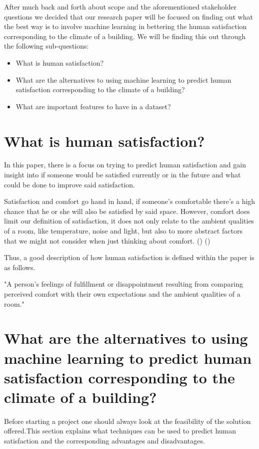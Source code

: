 \documentclass[12pt,a4paper]{article}
\begin{document}
After much back and forth about scope and the aforementioned stakeholder questions we decided that our research paper will be focused on finding out what the best way is to involve machine learning in bettering the human satisfaction corresponding to the climate of a building. 
We will be finding this out through the following sub-questions:

\begin{itemize}
	\item What is human satisfaction?
	\item What are the alternatives to using machine learning to predict human satisfaction corresponding to the climate of a building?
	\item What are important features to have in a dataset?
\end{itemize}

\pagebreak

\section{What is human satisfaction?}
In this paper, there is a focus on trying to predict human satisfaction and gain insight into if someone would be satisfied currently or in the future and what could be done to improve said satisfaction.

Satisfaction and comfort go hand in hand, if someone's comfortable there's a high chance that he or she will also be satisfied by said space. However, comfort does limit our definition of satisfaction, it does not only relate to the ambient qualities of a room, like temperature, noise and light, but also to more abstract factors that we might not consider when just thinking about comfort.
(\cite{Comfort_in_architecture}) (\cite{Human_Wants})

Thus, a good description of how human satisfaction is defined within the paper is as follows.
\begin{displayquote}
	"A person's feelings of fulfillment or disappointment resulting from comparing perceived comfort with their own expectations and the ambient qualities of a room."
\end{displayquote}

\section{What are the alternatives to using machine learning to predict human satisfaction corresponding to the climate of a building?}
Before starting a project one should always look at the feasibility of the solution offered.This section explains what techniques can be used to predict human satisfaction and the corresponding advantages and disadvantages.
\end{document}
